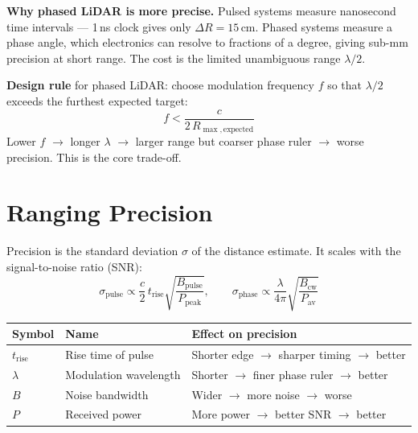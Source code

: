 \documentclass[12pt, a4paper]{article}
\begin{document}
\begin{notebox}
  \textbf{Why phased LiDAR is more precise.}
  Pulsed systems measure nanosecond time intervals --- 1\,ns clock gives
  only $\Delta R = 15$\,cm. Phased systems measure a phase angle, which
  electronics can resolve to fractions of a degree, giving sub-mm precision
  at short range. The cost is the limited unambiguous range $\lambda/2$.

  \textbf{Design rule} for phased LiDAR: choose modulation frequency $f$ so
  that $\lambda/2$ exceeds the furthest expected target:
  \[
    f < \frac{c}{2\,R_{\max,\text{expected}}}
  \]
  Lower $f$ $\rightarrow$ longer $\lambda$ $\rightarrow$ larger range but coarser phase
  ruler $\rightarrow$ worse precision. This is the core trade-off.
\end{notebox}

\section*{Ranging Precision}

Precision is the standard deviation $\sigma$ of the distance estimate.
It scales with the signal-to-noise ratio (SNR):
\[
  \sigma_{\text{pulse}} \propto \frac{c}{2}\,t_{\text{rise}}
    \sqrt{\frac{B_{\text{pulse}}}{P_{\text{peak}}}},
  \qquad
  \sigma_{\text{phase}} \propto \frac{\lambda}{4\pi}
    \sqrt{\frac{B_{\text{cw}}}{P_{\text{av}}}}
\]

\begin{center}
\renewcommand{\arraystretch}{1.4}
\begin{tabular}{p{1.5cm} p{3.5cm} p{7cm}}
  \toprule
  \textbf{Symbol} & \textbf{Name} & \textbf{Effect on precision} \\
  \midrule
  $t_{\text{rise}}$ & Rise time of pulse   & Shorter edge $\rightarrow$ sharper timing $\rightarrow$ better \\
  $\lambda$          & Modulation wavelength & Shorter $\rightarrow$ finer phase ruler $\rightarrow$ better \\
  $B$                & Noise bandwidth       & Wider $\rightarrow$ more noise $\rightarrow$ worse \\
  $P$                & Received power        & More power $\rightarrow$ better SNR $\rightarrow$ better \\
  \bottomrule
\end{tabular}
\end{center}
\end{document}
